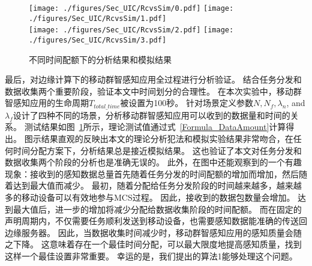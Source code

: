 
\begin{figure}[!b]
  \centering
  {\texttt{[image: ./figures/Sec\_UIC/RcvsSim/0.pdf]}}
  {\texttt{[image: ./figures/Sec\_UIC/RcvsSim/1.pdf]}}\\
  {\texttt{[image: ./figures/Sec\_UIC/RcvsSim/2.pdf]}}
  {\texttt{[image: ./figures/Sec\_UIC/RcvsSim/3.pdf]}}
  \vspace{-1em}
  \caption{不同时间配额下的分析结果和模拟结果}
  \label{Figure_EntireTest}
\end{figure}

最后，对边缘计算下的移动群智感知应用全过程进行分析验证。
结合任务分发和数据收集两个重要阶段，验证本文中时间划分的合理性。
在本次实验中，移动群智感知应用的生命周期$T_{total\_time}$被设置为100秒。
针对场景定义参数$N, N_f, \lambda_n$, and $\lambda_f$设计了四种不同的场景，分析移动群智感知应用可以收到的数据量和时间的关系。
测试结果如图~\ref{Figure_EntireTest}所示，理论测试值通过式~\eqref{Formula_DataAmount}计算得出。
图示结果直观的反映出本文的理论分析犯法和模拟实验结果非常吻合，在任何时间分配方案下，分析结果总是接近模拟结果。
这也验证了本文对任务分发和数据收集两个阶段的分析也是准确无误的。
此外，在图中还能观察到的一个有趣现象：接收到的感知数据总量首先随着任务分发的时间配额的增加而增加，然后随着达到最大值而减少。
最初，随着分配给任务分发阶段的时间越来越多，越来越多的移动设备可以有效地参与MCS过程。
因此，接收到的数据包数量会增加。
达到最大值后，进一步的增加将减少分配给数据收集阶段的时间配额。
而在固定的声明周期内，不仅需要任务顺利发送到移动设备，也需要感知数据能准确的传送回边缘服务器。
因此，当数据收集时间减少时，移动群智感知应用的感知质量会随之下降。
这意味着存在一个最佳时间分配，可以最大限度地提高感知质量，找到这样一个最佳设置非常重要。
幸运的是，我们提出的算法1能够处理这个问题。

